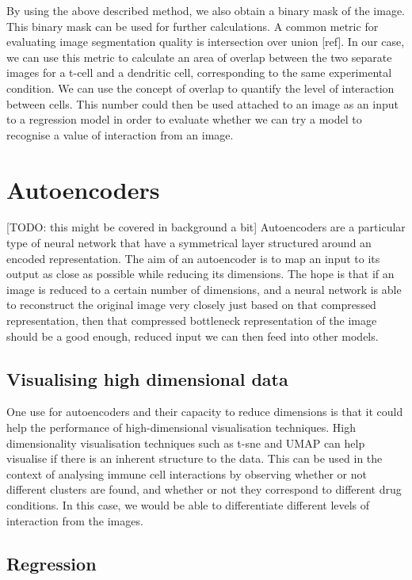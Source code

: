 \documentclass{l4proj}
\begin{document}
By using the above described method, we also obtain a binary mask of the image. This binary mask can be used for further calculations. A common metric for evaluating image segmentation quality is intersection over union [ref]. In our case, we can use this metric to calculate an area of overlap between the two separate images for a t-cell and a dendritic cell, corresponding to the same experimental condition. We can use the concept of overlap to quantify the level of interaction between cells. This number could then be used attached to an image as an input to a regression model in order to evaluate whether we can try a model to recognise a value of interaction from an image.

\section{Autoencoders}

[TODO: this might be covered in background a bit]
Autoencoders are a particular type of neural network that have a symmetrical layer structured around an encoded representation. The aim of an autoencoder is to map an input to its output as close as possible while reducing its dimensions. The hope is that if an image is reduced to a certain number of dimensions, and a neural network is able to reconstruct the original image very closely just based on that compressed representation, then that compressed bottleneck representation of the image should be a good enough, reduced input we can then feed into other models.


\subsection{Visualising high dimensional data}

One use for autoencoders and their capacity to reduce dimensions is that it could help the performance of high-dimensional visualisation techniques. High dimensionality visualisation techniques such as t-sne and UMAP can help visualise if there is an inherent structure to the data. This can be used in the context of analysing immune cell interactions by observing whether or not different clusters are found, and whether or not they correspond to different drug conditions. In this case, we would be able to differentiate different levels of interaction from the images.

\subsection{Regression}
\end{document}

